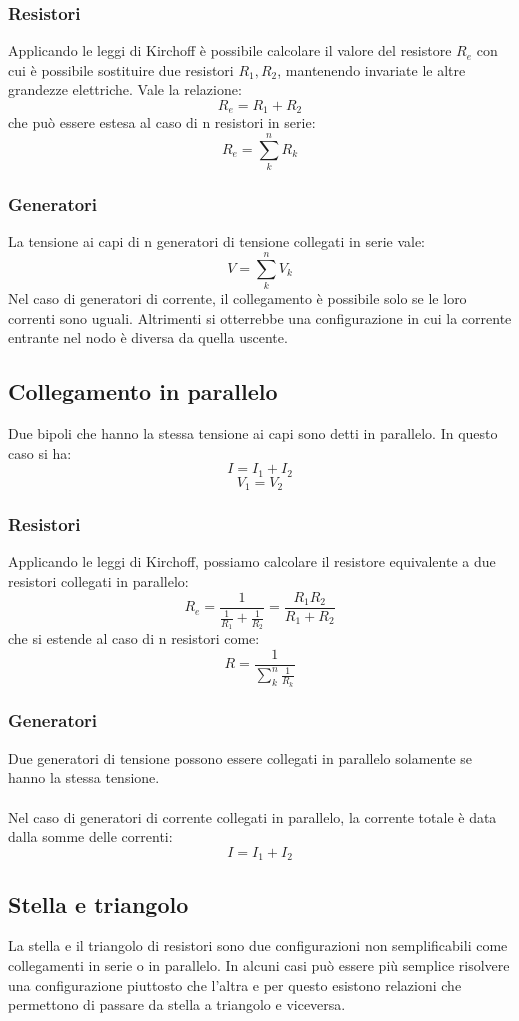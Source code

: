 \documentclass{article}
\begin{document}
\subsubsection{Resistori}
Applicando le leggi di Kirchoff è possibile calcolare il valore del resistore $R_e$ con cui è possibile sostituire due resistori $R_1,R_2$, mantenendo invariate le altre grandezze elettriche. Vale la relazione:
$$ R_e=R_1+R_2 $$
che può essere estesa al caso di n resistori in serie:
$$ R_e=\sum_k^nR_k $$

\subsubsection{Generatori}
La tensione ai capi di n generatori di tensione collegati in serie vale:
$$ V=\sum_k^nV_k $$
Nel caso di generatori di corrente, il collegamento è possibile solo se le loro correnti sono uguali. Altrimenti si otterrebbe una configurazione in cui la corrente entrante nel nodo è diversa da quella uscente.


\subsection{Collegamento in parallelo}
Due bipoli che hanno la stessa tensione ai capi sono detti in parallelo.
In questo caso si ha:
$$ I=I_1+I_2 $$
$$ V_1=V_2 $$

\subsubsection{Resistori}
Applicando le leggi di Kirchoff, possiamo calcolare il resistore equivalente a due resistori collegati in parallelo:
$$ R_e= \frac{1}{\frac{1}{R_1}+\frac{1}{R_2}}=\frac{R_1R_2}{R_1+R_2}$$
che si estende al caso di n resistori come:
$$ R=\frac{1}{\sum_k^n\frac{1}{R_k}} $$

\subsubsection{Generatori}
Due generatori di tensione possono essere collegati in parallelo solamente se hanno la stessa tensione.\\\\
Nel caso di generatori di corrente collegati in parallelo, la corrente totale è data dalla somme delle correnti:
$$ I=I_1+I_2 $$


\subsection{Stella e triangolo}
La stella e il triangolo di resistori sono due configurazioni non semplificabili come collegamenti in serie o in parallelo. In alcuni casi può essere più semplice risolvere una configurazione piuttosto che l'altra e per questo esistono relazioni che permettono di passare da stella a triangolo e viceversa.
\end{document}
